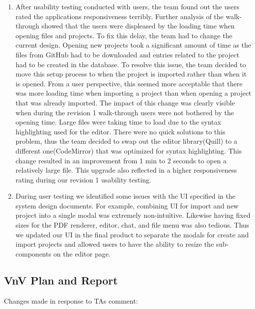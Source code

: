 \documentclass{article}
\begin{document}
	\begin{enumerate}
		\item After usability testing conducted with users, the team found out the users rated the applications responsiveness terribly. Further analysis of the walk-through showed that the users were displeased by the loading time when opening files and projects. To fix this delay, the team had to change the current design. Opening new projects took a significant amount of time as the files from GitHub had to be downloaded and entries related to the project had to be created in the database. To resolve this issue, the team decided to move this setup process to when the project is imported rather than when it is opened. From a user perspective, this seemed more acceptable that there was more loading time when importing a project than when opening a project that was already imported. The impact of this change was clearly visible when during the revision 1 walk-through users were not bothered by the opening time.  Large files were taking time to load due to the syntax highlighting used for the editor. There were no quick solutions to this problem, thus the team decided to swap out the editor library(Quill) to a different one(CodeMirror) that was optimized for syntax highlighting. This change resulted in an improvement from 1 min to 2 seconds to open a relatively large file. This upgrade also reflected in a higher responsiveness rating during our revision 1 usability testing.
		\item During user testing we identified some issues with the UI specified in the system design documents. For example, combining UI for import and new project into a single modal was extremely non-intuitive. Likewise having fixed sizes for the PDF renderer, editor, chat, and file menu was also tedious. Thus we updated our UI in the final product to separate the modals for create and import projects and allowed users to have the ability to resize the sub-components on the editor page.
	\end{enumerate}
	
	\subsection{VnV Plan and Report}
	
	Changes made in response to TAs comment:
	
\end{document}
